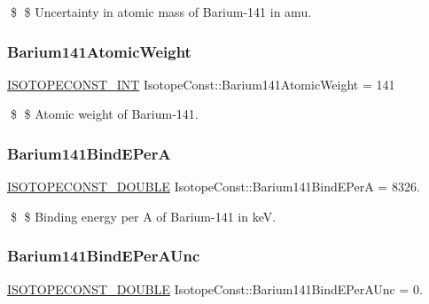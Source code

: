 \$ \$ Uncertainty in atomic mass of Barium-\/141 in amu. \mbox{\label{group___isotope_const-_barium-_ba141_gac3c3a3a55ee5080df4c7657079dd3f3b}} 
\subsubsection{\texorpdfstring{Barium141\+Atomic\+Weight}{Barium141AtomicWeight}}
{\footnotesize\ttfamily \mbox{\hyperlink{group___isotope_const-_macros_ga5f18360b3e99483a35c32d789e62621c}{I\+S\+O\+T\+O\+P\+E\+C\+O\+N\+S\+T\+\_\+\+I\+NT}} Isotope\+Const\+::\+Barium141\+Atomic\+Weight = 141}

\$ \$ Atomic weight of Barium-\/141. \mbox{\label{group___isotope_const-_barium-_ba141_ga90bd4709e963e9312217f0d85fb1b7ed}} 
\subsubsection{\texorpdfstring{Barium141\+Bind\+E\+PerA}{Barium141BindEPerA}}
{\footnotesize\ttfamily \mbox{\hyperlink{group___isotope_const-_macros_ga8f45a7272ce02c0b4c65c44636ed719a}{I\+S\+O\+T\+O\+P\+E\+C\+O\+N\+S\+T\+\_\+\+D\+O\+U\+B\+LE}} Isotope\+Const\+::\+Barium141\+Bind\+E\+PerA = 8326.}

\$ \$ Binding energy per A of Barium-\/141 in keV. \mbox{\label{group___isotope_const-_barium-_ba141_ga2f9a47b305f44d7afa4c1331f7891b82}} 
\subsubsection{\texorpdfstring{Barium141\+Bind\+E\+Per\+A\+Unc}{Barium141BindEPerAUnc}}
{\footnotesize\ttfamily \mbox{\hyperlink{group___isotope_const-_macros_ga8f45a7272ce02c0b4c65c44636ed719a}{I\+S\+O\+T\+O\+P\+E\+C\+O\+N\+S\+T\+\_\+\+D\+O\+U\+B\+LE}} Isotope\+Const\+::\+Barium141\+Bind\+E\+Per\+A\+Unc = 0.}

